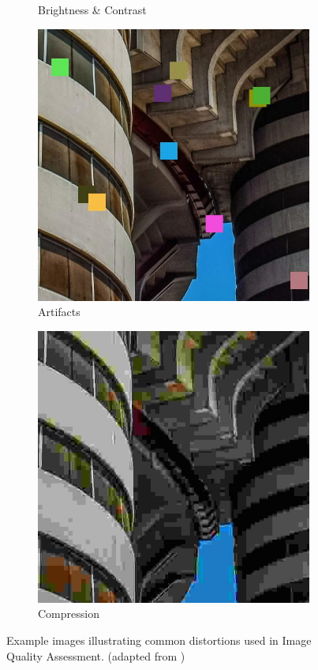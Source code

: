 \begin{figure}[ht]
\begin{subfigure}[b]{0.24\textwidth}
        \caption{Brightness \& Contrast}
        \label{fig:brightness_contrast}
    \end{subfigure}
    \hfill
    \begin{subfigure}[b]{0.24\textwidth}
        \includegraphics[width=\textwidth]{img/Artifacts.jpg}
        \caption{Artifacts}
        \label{fig:artifacts}
    \end{subfigure}
    \hfill
    \begin{subfigure}[b]{0.24\textwidth}
        \includegraphics[width=\textwidth]{img/Compression.jpg}
        \caption{Compression}
        \label{fig:compression}
    \end{subfigure}
    \caption{Example images illustrating common distortions used in Image Quality Assessment. (adapted from \autocite{ARNIQA})}
    \label{fig:distortions}
\end{figure}
